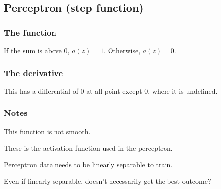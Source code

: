 
\subsection{Perceptron (step function)}

\subsubsection{The function}

If the sum is above \(0\), \(a(z)=1\). Otherwise, \(a(z)=0\).

\subsubsection{The derivative}

This has a differential of \(0\) at all point except \(0\), where it is undefined.

\subsubsection{Notes}

This function is not smooth.

These is the activation function used in the perceptron.

Perceptron data needs to be linearly separable to train.

Even if linearly separable, doesn't necessarily get the best outcome?

